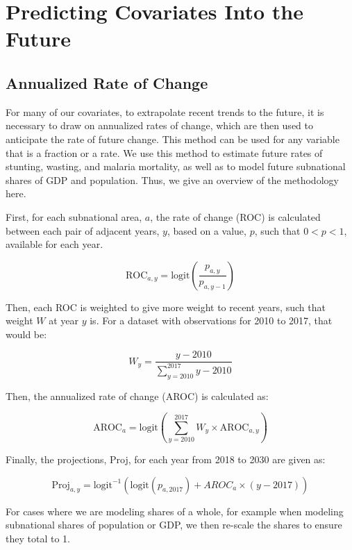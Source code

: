 \documentclass{article}
\begin{document}
\section{Predicting Covariates Into the Future}
\subsection{Annualized Rate of Change}
For many of our covariates, to extrapolate recent trends to the future, it is necessary to draw on annualized rates of change, which are then used to anticipate the rate of future change.  This method can be used for any variable that is a fraction or a rate.  We use this method to estimate future rates of stunting, wasting, and malaria mortality, as well as to model future subnational shares of GDP and population.  Thus, we give an overview of the methodology here.

First, for each subnational area, $a$, the rate of change (ROC) is calculated between each pair of adjacent years, $y$, based on a value, $p$, such that $0 < p < 1$, available for each year.

\begin{equation}
  \text{ROC}_{a,y} = \text{logit} \left( \frac{p_{a,y}}{p_{a,y-1}} \right)
  \label{eqn:a}
\end{equation}

Then, each ROC is weighted to give more weight to recent years, such that weight $W$ at year $y$ is.  For a dataset with observations for 2010 to 2017, that would be:

\begin{equation}
  W_y = \frac{y - 2010}{\sum_{y=2010}^{2017} y - 2010}
  \label{eqn:b}
\end{equation}

Then, the annualized rate of change (AROC) is calculated as:

\begin{equation}
  \text{AROC}_{a} = \text{logit} \left( \sum_{y=2010}^{2017} W_y \times \text{AROC}_{a, y} \right)
  \label{eqn:c}
\end{equation}

Finally, the projections, Proj, for each year from 2018 to 2030 are given as:

\begin{equation}
  \text{Proj}_{a,y} = \text{logit}^{-1} ( \text{logit} ( p_{a,2017} ) + AROC_{a} \times ( y - 2017 ) )
  \label{eqn:d}
\end{equation}

For cases where we are modeling shares of a whole, for example when modeling subnational shares of population or GDP, we then re-scale the shares to ensure they total to 1.
\end{document}
